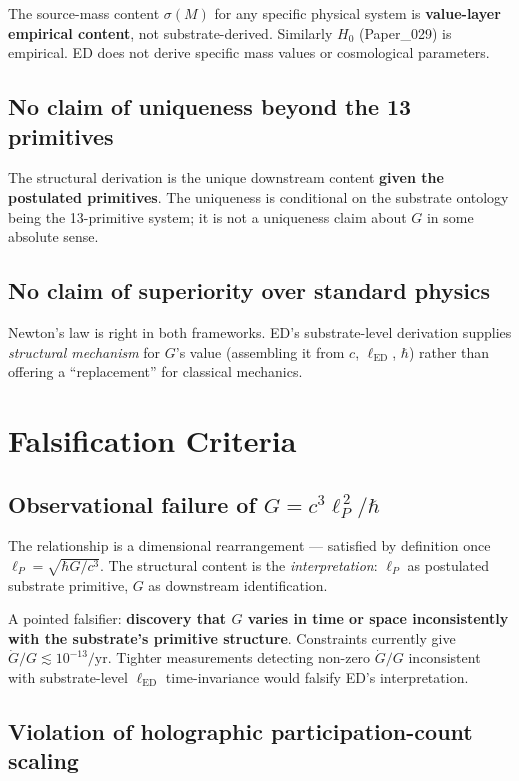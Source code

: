 \documentclass[11pt,a4paper]{article}
\begin{document}
The source-mass content $\sigma(M)$ for any specific physical system is \textbf{value-layer empirical content}, not substrate-derived. Similarly $H_0$ (Paper\_029) is empirical. ED does not derive specific mass values or cosmological parameters.

\subsection{No claim of uniqueness beyond the 13 primitives}

The structural derivation is the unique downstream content \textbf{given the postulated primitives}. The uniqueness is conditional on the substrate ontology being the 13-primitive system; it is not a uniqueness claim about $G$ in some absolute sense.

\subsection{No claim of superiority over standard physics}

Newton's law is right in both frameworks. ED's substrate-level derivation supplies \emph{structural mechanism} for $G$'s value (assembling it from $c$, $\ell_\mathrm{ED}$, $\hbar$) rather than offering a ``replacement'' for classical mechanics.

\section{Falsification Criteria}

\subsection{Observational failure of $G = c^3\ell_P^{\,2}/\hbar$}

The relationship is a dimensional rearrangement --- satisfied by definition once $\ell_P = \sqrt{\hbar G/c^3}$. The structural content is the \emph{interpretation}: $\ell_P$ as postulated substrate primitive, $G$ as downstream identification.

A pointed falsifier: \textbf{discovery that $G$ varies in time or space inconsistently with the substrate's primitive structure}. Constraints currently give $\dot{G}/G \lesssim 10^{-13}/\mathrm{yr}$. Tighter measurements detecting non-zero $\dot{G}/G$ inconsistent with substrate-level $\ell_\mathrm{ED}$ time-invariance would falsify ED's interpretation.

\subsection{Violation of holographic participation-count scaling}
\end{document}
